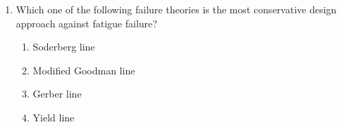 \documentclass[journal,12pt,onecolumn]{IEEEtran}
\theoremstyle{remark}
\begin{document}
\begin{enumerate}
\item Which one of the following failure theories is the most conservative design approach against fatigue failure?
\begin{enumerate}
	\item Soderberg line
	\item Modified Goodman line
	\item Gerber line
	\item Yield line
\end{enumerate}
\end{enumerate}
\end{document}
